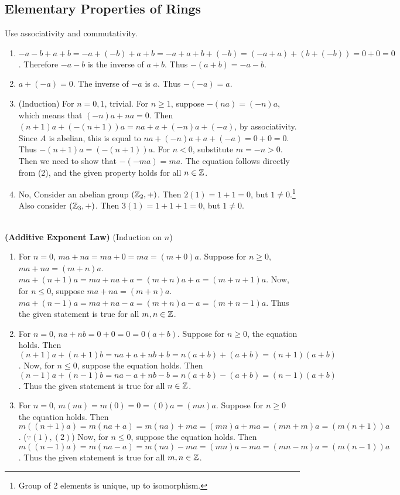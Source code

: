 \subsection{Elementary Properties of Rings}
 Use associativity and commutativity.
\begin{enumerate}
	\item $-a-b + a + b = -a +(-b) + a + b = -a + a + b + (-b) = (-a+a) + (b+(-b)) = 0 + 0 = 0$. Therefore $-a-b$ is the inverse of $a+b$. Thus $-(a+b) = -a-b$.
	\item $a + (-a) = 0$. The inverse of $-a$ is $a$. Thus $-(-a) = a$.
	\item (Induction) For $n = 0, 1$, trivial. For $n\geq 1$, suppose $-(na) = (-n)a$, which means that $(-n)a + na = 0$. Then $(n+1)a + (-(n+1))a = na + a + (-n)a + (-a)$, by associativity. Since $A$ is abelian, this is equal to $na + (-n)a + a + (-a) = 0 + 0 = 0$. Thus $-(n+1)a = (-(n+1))a$. For $n < 0$, substitute $m = -n > 0$. Then we need to show that $-(-ma) = ma$. The equation follows directly from (2), and the given property holds for all $n\in \mathbb{Z}$.
	\item No, Consider an abelian group $(\mathbb{Z}_2, +)$.
	Then $2(1) = 1 + 1 = 0$, but $1\neq 0$.\footnote{Group of 2 elements is unique, up to isomorphism.} Also consider $(\mathbb{Z}_3, +)$. Then $3(1) = 1 + 1 + 1 = 0$, but $1 \neq 0$.
\end{enumerate}~
\\
 \textbf{(Additive Exponent Law)} (Induction on $n$)
\begin{enumerate}
	\item For $n = 0$, $ma + na = ma + 0 = ma = (m+0)a$. Suppose for $n\geq 0$, $ma+na = (m+n)a$. $ma+(n+1)a = ma+na+a = (m+n)a + a = (m+n+1)a$. Now, for $n \leq 0$, suppose $ma+na = (m+n)a$. $ma + (n-1)a = ma + na - a = (m+n)a - a = (m+n-1)a$. Thus the given statement is true for all $m, n\in \mathbb{Z}$.
	\item For $n = 0$, $na+nb = 0 + 0 = 0 = 0(a+b)$. Suppose for $n\geq 0$, the equation holds. Then $(n+1)a+(n+1)b = na + a + nb + b = n(a+b) + (a+b) = (n+1)(a+b)$. Now, for $n\leq 0$, suppose the equation holds. Then $(n-1)a+(n-1)b = na - a + nb - b = n(a+b)-(a+b) = (n-1)(a+b)$. Thus the given statement is true for all $n\in \mathbb{Z}$.
	\item For $n = 0$, $m(na) = m(0) = 0 = (0)a = (mn)a$. Suppose for $n\geq 0$ the equation holds. Then $m((n+1)a)=m(na + a) = m(na) + ma = (mn)a + ma = (mn+m)a = (m(n+1))a$. ($\because (1), (2)$) Now, for $n\leq 0$, suppose the equation holds. Then $m((n-1)a) = m(na - a) = m(na)-ma = (mn)a-ma = (mn-m)a = (m(n-1))a$. Thus the given statement is true for all $m, n\in \mathbb{Z}$.
\end{enumerate}
